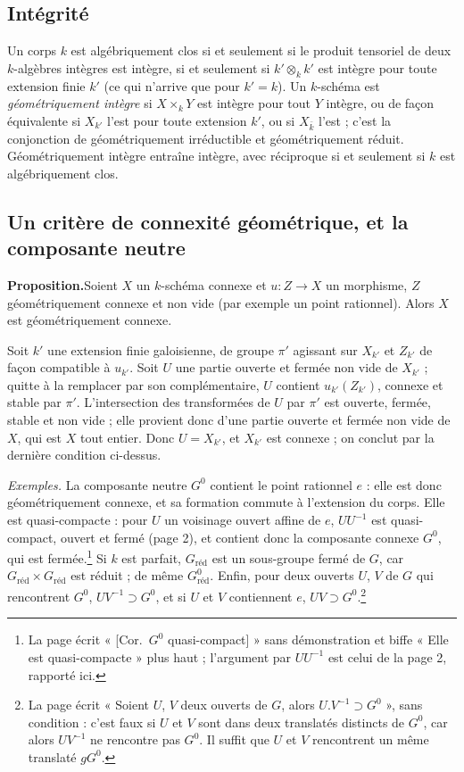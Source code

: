 \documentclass[11pt,a4paper]{article}
\begin{document}
\subsection*{Intégrité}

Un corps $k$ est algébriquement clos si et seulement si le produit tensoriel
de deux $k$-algèbres intègres est intègre, si et seulement si
$k' \otimes_{k} k'$ est intègre pour toute extension finie $k'$ (ce qui
n'arrive que pour $k' = k$). Un $k$-schéma est \emph{géométriquement intègre}
si $X \times_{k} Y$ est intègre pour tout $Y$ intègre, ou de façon équivalente
si $X_{k'}$ l'est pour toute extension $k'$, ou si $X_{\bar k}$ l'est ; c'est
la conjonction de géométriquement irréductible et géométriquement réduit.
Géométriquement intègre entraîne intègre, avec réciproque si et seulement si
$k$ est algébriquement clos.

\subsection*{Un critère de connexité géométrique, et la composante neutre}

\textbf{Proposition.}\quad Soient $X$ un $k$-schéma connexe et $u \colon Z \to X$ un morphisme, $Z$
géométriquement connexe et non vide (par exemple un point rationnel). Alors
$X$ est géométriquement connexe.

Soit $k'$ une extension finie galoisienne, de groupe $\pi'$ agissant sur
$X_{k'}$ et $Z_{k'}$ de façon compatible à $u_{k'}$. Soit $U$ une partie
ouverte et fermée non vide de $X_{k'}$ ; quitte à la remplacer par son
complémentaire, $U$ contient $u_{k'}(Z_{k'})$, connexe et stable par
$\pi'$. L'intersection des transformées de $U$ par $\pi'$ est ouverte,
fermée, stable et non vide ; elle provient donc d'une partie ouverte et
fermée non vide de $X$, qui est $X$ tout entier. Donc $U = X_{k'}$, et
$X_{k'}$ est connexe ; on conclut par la dernière condition ci-dessus.

\emph{Exemples.} La composante neutre $G^{0}$ contient le point rationnel
$e$ : elle est donc géométriquement connexe, et sa formation commute à
l'extension du corps. Elle est quasi-compacte : pour $U$ un voisinage ouvert
affine de $e$, $U U^{-1}$ est quasi-compact, ouvert et fermé (page 2), et
contient donc la composante connexe $G^{0}$, qui est fermée.\footnote{La
page écrit « [Cor.\ $G^{0}$ quasi-compact] » sans démonstration et biffe
« Elle est quasi-compacte » plus haut ; l'argument par $U U^{-1}$ est celui
de la page 2, rapporté ici.}
Si $k$ est parfait, $G_{\mathrm{réd}}$ est un sous-groupe fermé de $G$, car
$G_{\mathrm{réd}} \times G_{\mathrm{réd}}$ est réduit ; de même
$G^{0}_{\mathrm{réd}}$. Enfin, pour deux ouverts $U$, $V$ de $G$ qui
rencontrent $G^{0}$, $U V^{-1} \supset G^{0}$, et si $U$ et $V$ contiennent
$e$, $U V \supset G^{0}$.\footnote{La page écrit « Soient $U$, $V$ deux ouverts
de $G$, alors $U.V^{-1} \supset G^{0}$ », sans condition : c'est faux si
$U$ et $V$ sont dans deux translatés distincts de $G^{0}$, car alors
$U V^{-1}$ ne rencontre pas $G^{0}$. Il suffit que $U$ et $V$ rencontrent
un même translaté $g G^{0}$.}
\end{document}
